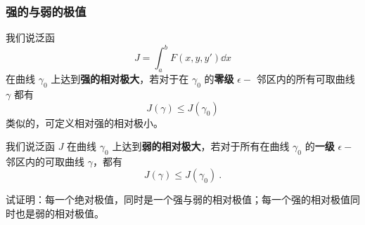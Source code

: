  \subsubsection{强的与弱的极值}
 我们说泛函
 \begin{equation}
 J=\int_a^b F(x,y,y')\dd x
 \end{equation}
 在曲线 $\gamma_0$ 上达到\textbf{强的相对极大}，若对于在 $\gamma_0$ 的\textbf{零级} $\epsilon-$ 邻区内的所有可取曲线 $\gamma$ 都有
 \begin{equation}
 J(\gamma)\leq J(\gamma_0)
 \end{equation}
 类似的，可定义相对强的相对极小。

我们说泛函 $J$ 在曲线 $\gamma_0$ 上达到\textbf{弱的相对极大}，若对于所有在曲线 $\gamma_0$ 的\textbf{一级} $\epsilon-$ 邻区内的可取曲线 $\gamma$，都有
\begin{equation}
J(\gamma)\leq J(\gamma_0)~.
\end{equation}
\begin{exercise}{}\label{exe_AbPol_1}
试证明：每一个绝对极值，同时是一个强与弱的相对极值；每一个强的相对极值同时也是弱的相对极值。
\end{exercise}